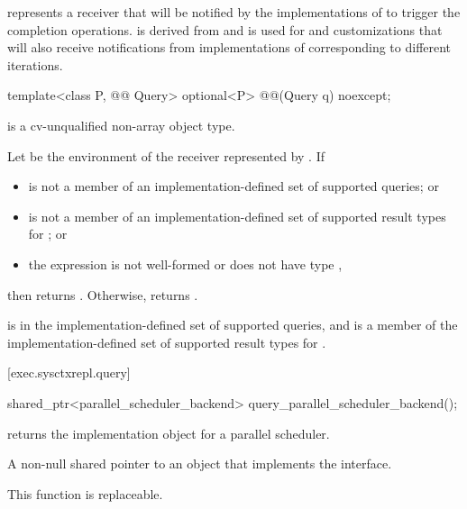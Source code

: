 \pnum
{} represents a receiver
that will be notified
by the implementations of 
to trigger the completion operations.
 is derived from  and
is used for  and  customizations
that will also receive notifications
from implementations of 
corresponding to different iterations.

\begin{itemdecl}
template<class P, @@ Query>
  optional<P> @@(Query q) noexcept;
\end{itemdecl}

\begin{itemdescr}
\pnum
\mandates
{} is a cv-unqualified non-array object type.

\pnum
\returns
Let  be the environment of the receiver represented by .
If
\begin{itemize}
\item
{} is not a member of an implementation-defined set
of supported queries; or
\item
{} is not a member of an implementation-defined set
of supported result types for ; or
\item
the expression  is not well-formed or
does not have type \cv{} ,
\end{itemize}
then returns .
Otherwise, returns .

\pnum
\remarks
{} is
in the implementation-defined set of supported queries, and
 is a member
of the implementation-defined set of supported result types
for .
\end{itemdescr}

[exec.sysctxrepl.query]{}

%
\begin{itemdecl}
shared_ptr<parallel_scheduler_backend> query_parallel_scheduler_backend();
\end{itemdecl}

\begin{itemdescr}
\pnum
{} returns
the implementation object for a parallel scheduler.

\pnum
\returns
A non-null shared pointer to an object
that implements the  interface.

\pnum
\remarks
This function is replaceable.
\end{itemdescr}

